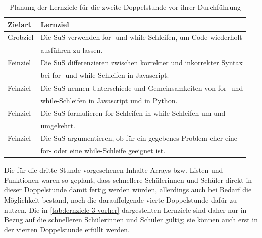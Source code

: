 \begin{table}[h!]
\begin{tabular*}{\linewidth}{l|l}
	\hline
	\textbf{Zielart} & \textbf{Lernziel}\\
	\hline \hline
	Grobziel & Die SuS verwenden for- und while-Schleifen, um Code wiederholt\\
	& ausführen zu lassen.\\
	Feinziel & Die SuS differenzieren zwischen korrekter und inkorrekter Syntax\\
	& bei for- und while-Schleifen in Javascript.\\
	Feinziel & Die SuS nennen Unterschiede und Gemeinsamkeiten von for- und\\
	& while-Schleifen in Javascript und in Python.\\
	Feinziel & Die SuS formulieren for-Schleifen in while-Schleifen um und\\
	& umgekehrt.\\
	Feinziel & Die SuS argumentieren, ob für ein gegebenes Problem eher eine\\
	& for- oder eine while-Schleife geeignet ist.\\
	\hline
\end{tabular*}
\caption{Planung der Lernziele für die zweite Doppelstunde vor ihrer Durchführung}
\label{tab:lernziele-2-vorher}
\end{table}

Die für die dritte Stunde vorgesehenen Inhalte Arrays bzw. Listen und Funktionen waren so geplant, dass schnellere Schülerinnen und Schüler direkt in dieser Doppelstunde damit fertig werden würden, allerdings auch bei Bedarf die Möglichkeit bestand, noch die darauffolgende vierte Doppelstunde dafür zu nutzen.
Die in \autoref{tab:lernziele-3-vorher} dargestellten Lernziele sind daher nur in Bezug auf die schnelleren Schülerinnen und Schüler gültig; sie können auch erst in der vierten Doppelstunde erfüllt werden.

